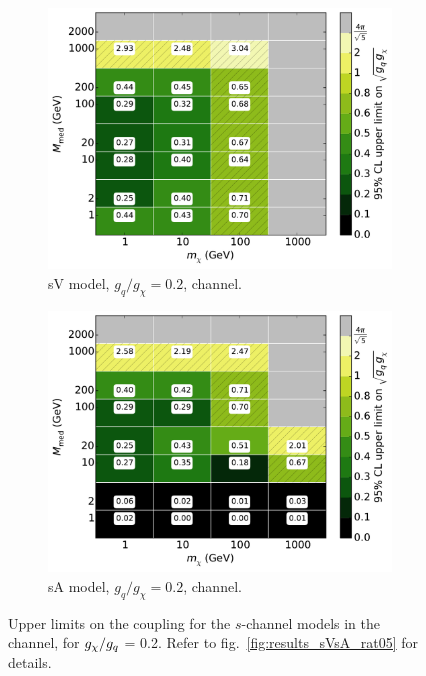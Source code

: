 \begin{figure}
  \centering
  \begin{subfigure}[t]{0.495\textwidth}
    \centering
    \includegraphics[width=1.\textwidth]{figures/grid_basepoints_SVD_rat02_monojet.pdf}
    \caption{sV model, $g_q/g_{\chi} = 0.2$, \monojet channel.}
  \end{subfigure}
  \begin{subfigure}[t]{0.495\textwidth}
    \centering
    \includegraphics[width=1.\textwidth]{figures/grid_basepoints_SAD_rat02_monojet.pdf}
    \caption{sA model, $g_q/g_{\chi} = 0.2$, \monojet channel.}
  \end{subfigure}
  \caption{Upper limits on the coupling for the $s$-channel models in the \monojet channel, for $g_{\chi} / g_q$ = 0.2. Refer to fig.~\ref{fig:results_sVsA_rat05} for details.}
  \label{fig:results_sVsA_rat02}
\end{figure}

